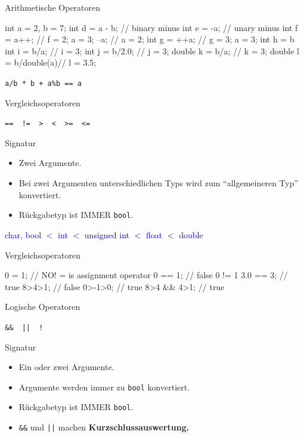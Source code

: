 \ifnum\conditionmacro=1 \documentclass[handout,usenames,dvipsnames]{beamer}\fi
\begin{document}
\begin{frame}[fragile]{Arithmetische Operatoren}
\begin{TPCpp}
int    a = 2, b = 7;
int    d = a - b;     // binary minus
int    e = -a;        // unary minus
int    f = a++;       // f = 2; a = 3;
--a;                  // a = 2;
int    g = ++a;       // g = 3; a = 3;
int    h = b %
int    i = b/a;       // i = 3;
int    j = b/2.0;     // j = 3;
double k = b/a;       // k = 3;
double l = b/double(a)// l = 3.5;
\end{TPCpp}

\begin{center}
\verb.a/b * b + a%b == a.
\end{center}
\end{frame}

\begin{frame}[fragile]{Vergleichsoperatoren}
\begin{center}
\verb.==  !=  >  <  >=  <=.
\end{center}

\begin{block}{Signatur}
\begin{itemize}
\item Zwei Argumente.
\item Bei zwei Argumenten unterschiedlichen Typs wird zum ``allgemeineren Typ'' konvertiert.
\item Rückgabetyp ist IMMER \verb+bool+.
\end{itemize}
\end{block}

\begin{center}
\textcolor{blue}{char, bool $<$ int $<$ unsigned int $<$ float $<$ double}
\end{center}
\end{frame}

\begin{frame}[fragile]{Vergleichsoperatoren}
\begin{TPCpp}
0 = 1;       // NO! = is assignment operator
0 == 1;      // false 0 != 1
3.0 == 3;    // true
8>4>1;       // false
0>-1>0;      // true
8>4 && 4>1;  // true
\end{TPCpp}
\end{frame}

\begin{frame}[fragile]{Logische Operatoren}
\begin{center}
\verb+&&  ||  !+
\end{center}
\begin{block}{Signatur}
\begin{itemize}
\item Ein oder zwei Argumente.
\item Argumente werden immer zu \verb+bool+ konvertiert.
\item Rückgabetyp ist IMMER \verb+bool+.
\item \verb+&&+ und \verb+||+ machen \textbf{Kurzschlussauswertung.}
\end{itemize}
\end{block}
\end{frame}
\end{document}
